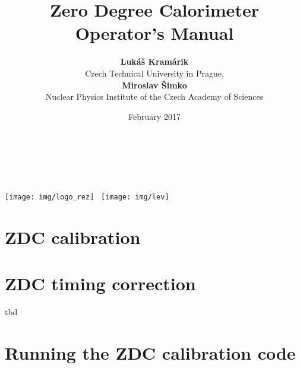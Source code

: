 \documentclass[a4paper,10pt]{report}
\title{Zero Degree Calorimeter Operator's Manual}
\author{\textbf{Lukáš Kramárik}\\
Czech Technical University in Prague,\\[.5cm] 
\textbf{Miroslav Šimko}\\[.4cm]
Nuclear Physics Institute of the Czech Academy of Sciences}
\date{February 2017}
\begin{document}
\makeatletter
\begin{titlepage}
\begin{center}
{\huge \bfseries  \@title }\\[2cm]
{\LARGE  \@author}\\[4ex] 
{\large \@date}\\[50ex]
\texttt{[image: img/logo\_rez]}\hspace*{3cm}~%
\texttt{[image: img/lev]}
\end{center}
\end{titlepage}
\makeatother
\thispagestyle{empty}
\newpage


\tableofcontents






\chapter{ZDC calibration\label{calibration}}


\chapter{ZDC timing correction\label{timing}}
tbd

\chapter{Running the ZDC calibration code\label{code}}





\end{document}
